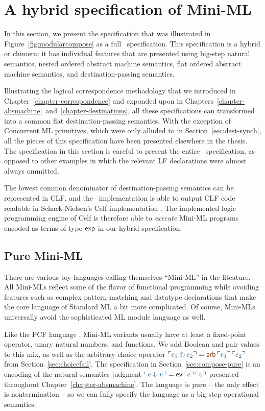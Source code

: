 \chapter{A hybrid specification of Mini-ML}
\label{chapter-appendix-hybrid}

In this section, we present the specification that was illustrated in
Figure~\ref{fig:modularcompose} as a full \sls~specification. This
specification is a hybrid or chimera: it has individual features that
are presented using big-step natural semantics, nested ordered abstract
machine semantics, flat ordered abstract machine semantics, and
destination-passing semantics.

Illustrating the logical correspondence methadology that we introduced
in Chapter~\ref{chapter-correspondence} and exponded upon in
Chapters~\ref{chapter-absmachine}~and~\ref{chapter-destinations}, all
these specifications can transformed into a common flat
destination-passing semantics. With the exception of Concurrent ML
primitives, which were only alluded to in
Section~\ref{sec:dest-synch}, all the pieces of this specification
have been presented elsewhere in the thesis. The specification in this
section is careful to present the entire \sls~specification, as
opposed to other examples in which the relevant LF declarations were
almost always ommitted.

The lowest common denominator of destination-passing semantics can be
represented in CLF, and the \sls~implementation is able to output CLF
code readable in Schack-Nielsen's Celf implementation
\cite{schacknielsen08celf}. The implemented logic programming engine
of Celf is therefore able to {\it execute} Mini-ML programs encoded as
terms of type ${\sf exp}$ in our hybrid specification.

\section{Pure Mini-ML}

There are various toy languages calling themselves ``Mini-ML'' in the
liteature. All Mini-MLs reflect some of the flavor of functional
programming while avoiding features such as complex pattern-matching
and datatype declarations that make the core language of Standard ML
\cite{milner97definition} a bit more complicated.  Of course, Mini-MLs
universally avoid the sophisticated ML module language as well.

Like the PCF language \cite{plotkin77lcf}, Mini-ML variants usually
have at least a fixed-point operator, unary natural numbers, and
functions. We add Boolean and pair values to this mix, as well as the
arbitrary choice operator $\interp{e_1 \arb e_2} = \lf{{\sf
  arb}\,\interp{e_1}\,\interp{e_2}}$ from
Section~\ref{sec:choicefail}. The specification in
Section~\ref{sec:compose-pure} is an encoding of the natural semantics
judgment $\interp{e \Downarrow v} = {\sf ev}\,\interp{e}\,\interp{v}$
presented throughout Chapter~\ref{chapter-absmachine}. The language is
pure -- the only effect is nontermination -- so we can fully specify
the language as a big-step operational semantics.


